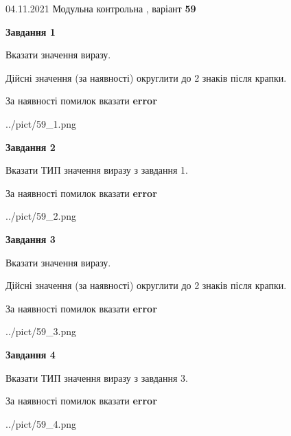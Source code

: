 \documentclass[11pt, ukrainian]{article}
\begin{document}
{04.11.2021 Модульна контрольна , варіант  \No \textbf { 59 }\par}
{
\begin {large}
{\begin {center}\textbf{Завдання 1}\end {center}}\par
Вказати значення виразу. \par
Дійсні значення (за наявності) округлити до 2 знаків після крапки. \par
За наявності помилок вказати \textbf{error}

\begin{center}
	{../pict/59_1.png}
\end{center}
\newpage

{\begin {center}\textbf{Завдання 2}\end {center}}\par
Вказати ТИП значення виразу з завдання 1. \par
За наявності помилок вказати \textbf{error}

\begin{center}
	{../pict/59_2.png}
\end{center}
\newpage

{\begin {center}\textbf{Завдання 3}\end {center}}\par
Вказати значення виразу. \par
Дійсні значення (за наявності) округлити до 2 знаків після крапки. \par
За наявності помилок вказати \textbf{error}

\begin{center}
	{../pict/59_3.png}
\end{center}
\newpage

{\begin {center}\textbf{Завдання 4}\end {center}}\par
Вказати ТИП значення виразу з завдання 3. \par
За наявності помилок вказати \textbf{error}

\begin{center}
	{../pict/59_4.png}
\end{center}
\newpage


\end{large}}
\end{document}
